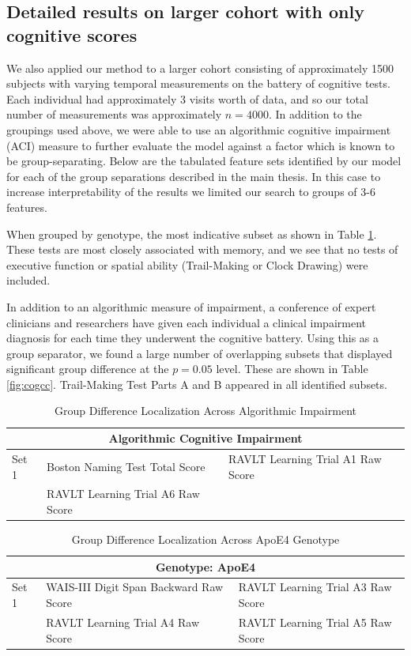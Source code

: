 \subsection{Detailed results on larger cohort with only cognitive scores}
We also applied our method to a larger cohort consisting of approximately 1500 subjects with varying temporal measurements on the battery of cognitive tests. Each individual had approximately 3 visits worth of data, and so our total number of measurements was approximately $n = 4000$. In addition to the groupings used above, we were able to use an algorithmic cognitive impairment (ACI) measure to further evaluate the model against a factor which is known to be group-separating. Below are the tabulated feature sets identified by our model for each of the group separations described in the main thesis. In this case to increase interpretability of the results we limited our search to groups of 3-6 features.

When grouped by genotype, the most indicative subset as shown in Table \ref{fig:coggenotype}. These tests are most closely associated with memory, and we see that no tests of executive function or spatial ability (Trail-Making or Clock Drawing) were included.

In addition to an algorithmic measure of impairment, a conference of expert clinicians and researchers have given each individual a clinical impairment diagnosis for each time they underwent the cognitive battery. Using this as a group separator, we found a large number of overlapping subsets that displayed significant group difference at the $p = 0.05$ level. These are shown in Table \ref{fig:cogcc}. Trail-Making Test Parts A and B appeared in all identified subsets.

\begin{table}
	\centering
	\begin{tabular}{p{0.8cm}p{5.5cm}p{6cm}}
		\toprule
		\multicolumn{3}{c}{\textbf{Algorithmic Cognitive Impairment}}\\ \midrule \midrule
		Set 1 & Boston Naming Test Total Score & RAVLT Learning Trial A1 Raw Score \\ 
		 & RAVLT Learning Trial A6 Raw Score &  \\ \bottomrule
		\bottomrule
	\end{tabular}
	\caption[Localization across algorithmic impairment]{Group Difference Localization Across Algorithmic Impairment}
\end{table}

\begin{table}
	\centering
	\begin{tabular}{p{0.8cm}p{5.5cm}p{6cm}}
		\toprule
		\multicolumn{3}{c}{\textbf{Genotype: ApoE4}}\\ \midrule \midrule
		Set 1 & WAIS-III Digit Span Backward Raw Score & RAVLT Learning Trial A3 Raw Score \\
		& RAVLT Learning Trial A4 Raw Score & RAVLT Learning Trial A5 Raw Score \\
		\bottomrule
		\bottomrule
	\end{tabular}
	\caption[Localization across ApoE4]{Group Difference Localization Across ApoE4 Genotype}
	\label{fig:coggenotype}
\end{table}

